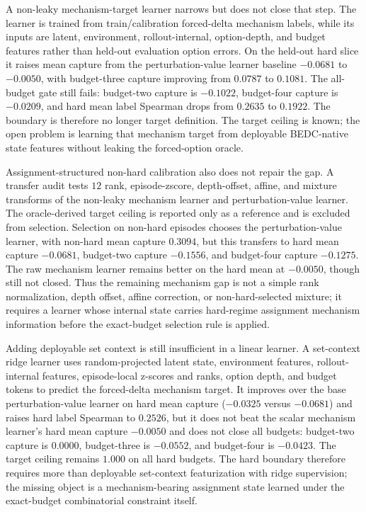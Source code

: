 A non-leaky mechanism-target learner narrows but does not close that step.  The
learner is trained from train/calibration forced-delta mechanism labels, while
its inputs are latent, environment, rollout-internal, option-depth, and budget
features rather than held-out evaluation option errors.  On the held-out hard
slice it raises mean capture from the perturbation-value learner baseline
$-0.0681$ to $-0.0050$, with budget-three capture improving from $0.0787$ to
$0.1081$.  The all-budget gate still fails: budget-two capture is $-0.1022$,
budget-four capture is $-0.0209$, and hard mean label Spearman drops from
$0.2635$ to $0.1922$.  The boundary is therefore no longer target definition.
The target ceiling is known; the open problem is learning that mechanism target
from deployable BEDC-native state features without leaking the forced-option
oracle.

Assignment-structured non-hard calibration also does not repair the gap.  A
transfer audit tests $12$ rank, episode-zscore, depth-offset, affine, and
mixture transforms of the non-leaky mechanism learner and perturbation-value
learner.  The oracle-derived target ceiling is reported only as a reference and
is excluded from selection.  Selection on non-hard episodes chooses the
perturbation-value learner, with non-hard mean capture $0.3094$, but this
transfers to hard mean capture $-0.0681$, budget-two capture $-0.1556$, and
budget-four capture $-0.1275$.  The raw mechanism learner remains better on the
hard mean at $-0.0050$, though still not closed.  Thus the remaining mechanism
gap is not a simple rank normalization, depth offset, affine correction, or
non-hard-selected mixture; it requires a learner whose internal state carries
hard-regime assignment mechanism information before the exact-budget selection
rule is applied.

Adding deployable set context is still insufficient in a linear learner.  A
set-context ridge learner uses random-projected latent state, environment
features, rollout-internal features, episode-local z-scores and ranks, option
depth, and budget tokens to predict the forced-delta mechanism target.  It
improves over the base perturbation-value learner on hard mean capture
($-0.0325$ versus $-0.0681$) and raises hard label Spearman to $0.2526$, but it
does not beat the scalar mechanism learner's hard mean capture $-0.0050$ and
does not close all budgets: budget-two capture is $0.0000$, budget-three is
$-0.0552$, and budget-four is $-0.0423$.  The target ceiling remains $1.000$ on
all hard budgets.  The hard boundary therefore requires more than deployable
set-context featurization with ridge supervision; the missing object is a
mechanism-bearing assignment state learned under the exact-budget combinatorial
constraint itself.

